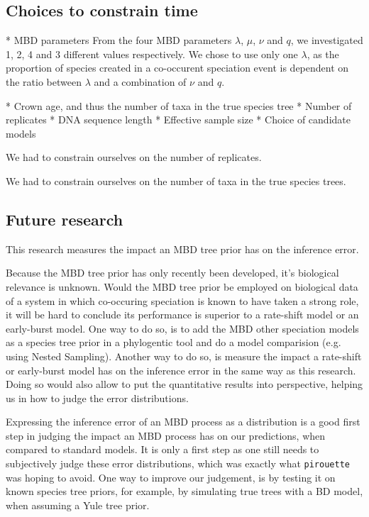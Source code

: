 \subsection{Choices to constrain time}

 * MBD parameters
From the four MBD parameters $\lambda$, $\mu$, $\nu$ and $q$,
we investigated 1, 2, 4 and 3 different values respectively.
We chose to use only one $\lambda$, as the proportion of species
created in a co-occurent speciation event is dependent on the ratio
between $\lambda$ and a combination of $\nu$ and $q$.  

 * Crown age, and thus the number of taxa in the true species tree
 * Number of replicates
 * DNA sequence length
 * Effective sample size
 * Choice of candidate models
 
We had to constrain ourselves on the number of replicates.

We had to constrain ourselves on the number of taxa in
the true species trees.

\subsection{Future research}

This research measures the impact an MBD tree prior 
has on the inference error. 

Because the MBD tree prior has only recently been 
developed, it's biological relevance is unknown.
Would the MBD tree prior be employed on biological data of a system
in which co-occuring speciation is known to have taken a strong role,
it will be hard to conclude its performance is superior to a
rate-shift model or an early-burst model. One way to do so, is
to add the MBD other speciation models as a species tree prior
in a phylogentic tool and do a model comparision (e.g. using Nested Sampling).
Another way to do so, is measure the impact a rate-shift or early-burst model
has on the inference error in the same way as this research.
Doing so would also allow to put the quantitative results into perspective,
helping us in how to judge the error distributions. 

Expressing the inference error of an MBD process as a distribution
is a good first step in judging the impact an MBD process has on
our predictions, when compared to standard models. It is only a first
step as one still needs to subjectively judge these error distributions,
which was exactly what \verb;pirouette; was hoping to avoid. 
One way to improve our judgement, is by testing it on known species tree
priors, for example, by simulating true trees with a BD model, when assuming
a Yule tree prior.  
